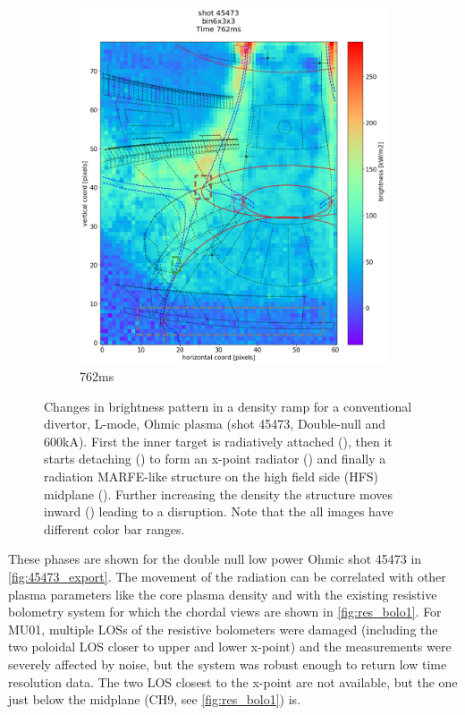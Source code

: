 \begin{figure}
\begin{subfigure}{0.4\linewidth}
         \includegraphics[trim={5 25 0 80},clip,width=\textwidth]{Chapters/chapter2/figs/IRVB-MASTU_shot-45473_export_38.png}
         \caption{762ms}
         \label{fig:45473_export_5}
     \end{subfigure}
    \caption{Changes in brightness pattern in a density ramp for a conventional divertor, L-mode, Ohmic plasma (shot 45473, Double-null and 600kA). First the inner target is radiatively attached (), then it starts detaching () to form an x-point radiator () and finally a radiation MARFE-like structure on the high field side (HFS) midplane (). Further increasing the density the structure moves inward () leading to a disruption. Note that the all images have different color bar ranges.}
    \label{fig:45473_export}
\end{figure}

These phases are shown for the double null low power Ohmic shot 45473 in \autoref{fig:45473_export}. The movement of the radiation can be correlated with other plasma parameters like the core plasma density and with the existing resistive bolometry system for which the chordal views are shown in \autoref{fig:res_bolo1}. For MU01, multiple LOSs of the resistive bolometers were damaged (including the two poloidal LOS closer to upper and lower x-point) and the measurements were severely affected by noise, but the system was robust enough to return low time resolution data. The two LOS closest to the x-point are not available, but the one just below the midplane (CH9, see \autoref{fig:res_bolo1}) is.%

